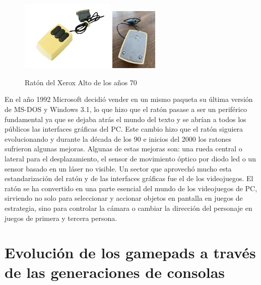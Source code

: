 \begin{figure}[!htb]
\begin{minipage}{0.9\textwidth}
    \centering
    \includegraphics[width=0.40\textwidth]{./Imagenes/Bitmap/mouse_xerox_alto(1).png}
    \includegraphics[width=0.20\textwidth]{./Imagenes/Bitmap/mouse_xerox_alto(2).jpg}
\end{minipage}
    \caption{Rat\'on del Xerox Alto de los a\~nos 70}
\label{Fig:xerox}
\end{figure}

En el a\~no 1992 Microsoft decidi\'o vender en un mismo paqueta su \'ultima versi\'on de MS-DOS y Windows 3.1, lo que hizo que el rat\'on pasase a ser un perif\'erico fundamental ya que se dejaba atr\'as el mundo del texto y se abr\'ian a todos los p\'ublicos las interfaces gr\'aficas del PC. Este cambio hizo que el rat\'on siguiera evolucionando y durante la d\'ecada de los 90 e inicios del 2000 los ratones sufrieron algunas mejoras. Algunas de estas mejoras son: una rueda central o lateral para el desplazamiento, el sensor de movimiento \'optico por diodo led o un sensor basado en un l\'aser no visible. Un sector que aprovech\'o mucho esta estandarizaci\'on del rat\'on y de las interfaces gr\'aficas fue el de los videojuegos. El rat\'on se ha convertido en una parte esencial del mundo de los videojuegos de PC, sirviendo no solo para seleccionar y accionar objetos en pantalla en juegos de estrategia, sino para controlar la c\'amara o cambiar la direcci\'on del personaje en juegos de primera y tercera persona.\\

\section{Evoluci\'on de los gamepads a trav\'es de las generaciones de consolas}

